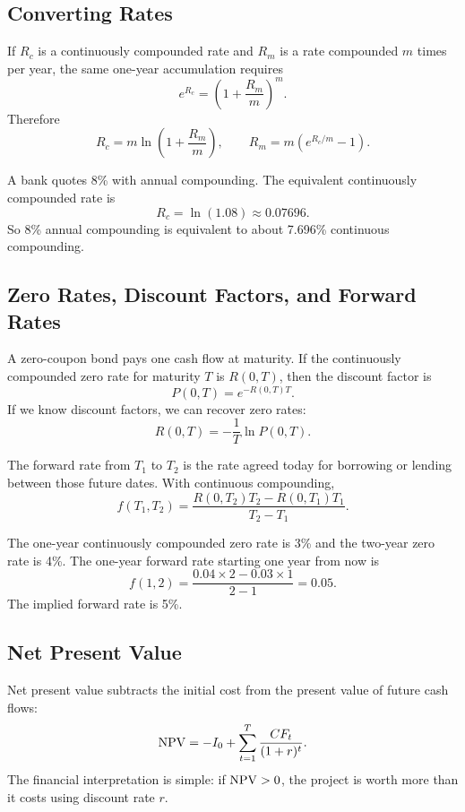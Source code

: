 \subsection{Converting Rates}

If $R_c$ is a continuously compounded rate and $R_m$ is a rate compounded $m$
times per year, the same one-year accumulation requires
\[
    e^{R_c}=\left(1+\frac{R_m}{m}\right)^m.
\]
Therefore
\[
    R_c = m\ln\left(1+\frac{R_m}{m}\right),
    \qquad
    R_m = m\left(e^{R_c/m}-1\right).
\]

\begin{exmp}
A bank quotes 8\% with annual compounding. The equivalent continuously
compounded rate is
\[
    R_c=\ln(1.08)\approx 0.07696.
\]
So 8\% annual compounding is equivalent to about 7.696\% continuous compounding.
\end{exmp}

\subsection{Zero Rates, Discount Factors, and Forward Rates}

A zero-coupon bond pays one cash flow at maturity. If the continuously
compounded zero rate for maturity $T$ is $R(0,T)$, then the discount factor is
\[
    P(0,T)=e^{-R(0,T)T}.
\]
If we know discount factors, we can recover zero rates:
\[
    R(0,T)=-\frac{1}{T}\ln P(0,T).
\]

The forward rate from $T_1$ to $T_2$ is the rate agreed today for borrowing or
lending between those future dates. With continuous compounding,
\[
    f(T_1,T_2)
    =
    \frac{R(0,T_2)T_2-R(0,T_1)T_1}{T_2-T_1}.
\]

\begin{exmp}
The one-year continuously compounded zero rate is 3\% and the two-year zero rate
is 4\%. The one-year forward rate starting one year from now is
\[
    f(1,2)=\frac{0.04\times 2-0.03\times 1}{2-1}=0.05.
\]
The implied forward rate is 5\%.
\end{exmp}

\subsection{Net Present Value}

Net present value subtracts the initial cost from the present value of future
cash flows:
\[
    \mathrm{NPV} = -I_0 + \sum_{t=1}^{T}\frac{CF_t}{(1+r)^t}.
\]
The financial interpretation is simple: if $\mathrm{NPV}>0$, the project is worth more
than it costs using discount rate $r$.

